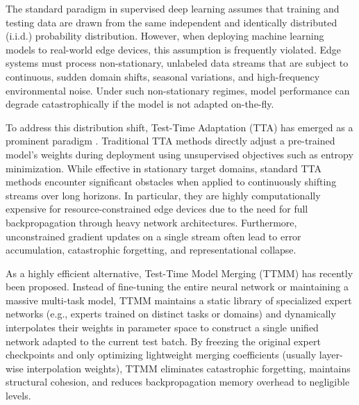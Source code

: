 \documentclass{article}
\theoremstyle{plain}
\theoremstyle{definition}
\theoremstyle{remark}
\begin{document}
The standard paradigm in supervised deep learning assumes that training and testing data are drawn from the same independent and identically distributed (i.i.d.) probability distribution. However, when deploying machine learning models to real-world edge devices, this assumption is frequently violated. Edge systems must process non-stationary, unlabeled data streams that are subject to continuous, sudden domain shifts, seasonal variations, and high-frequency environmental noise. Under such non-stationary regimes, model performance can degrade catastrophically if the model is not adapted on-the-fly.

To address this distribution shift, Test-Time Adaptation (TTA) has emerged as a prominent paradigm \citep{wang2021tent, wang2022cotta}. Traditional TTA methods directly adjust a pre-trained model's weights during deployment using unsupervised objectives such as entropy minimization. While effective in stationary target domains, standard TTA methods encounter significant obstacles when applied to continuously shifting streams over long horizons. In particular, they are highly computationally expensive for resource-constrained edge devices due to the need for full backpropagation through heavy network architectures. Furthermore, unconstrained gradient updates on a single stream often lead to error accumulation, catastrophic forgetting, and representational collapse.

As a highly efficient alternative, Test-Time Model Merging (TTMM) has recently been proposed. Instead of fine-tuning the entire neural network or maintaining a massive multi-task model, TTMM maintains a static library of specialized expert networks (e.g., experts trained on distinct tasks or domains) and dynamically interpolates their weights in parameter space to construct a single unified network adapted to the current test batch. By freezing the original expert checkpoints and only optimizing lightweight merging coefficients (usually layer-wise interpolation weights), TTMM eliminates catastrophic forgetting, maintains structural cohesion, and reduces backpropagation memory overhead to negligible levels.
\end{document}
